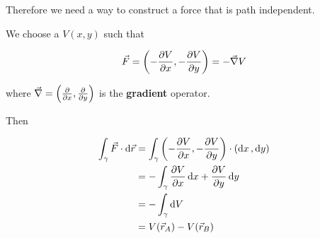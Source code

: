 \documentclass[10pt]{extarticle}
\begin{document}
Therefore we need a way to construct a force that is path independent.

We choose a $V(x, y)$ such that

$$
  \vec{F} = \left( - \pdv{V}{x}, - \pdv{V}{y} \right) = -\vec{\nabla} V
$$

where $\vec{\nabla} = \left( \pdv{x}, \pdv{y} \right)$ is the \textbf{gradient} operator.

Then

\begin{align*}
  \int_\gamma \vec{F} \cdot \dd{\vec{r}} & = \int_\gamma \left( -\pdv{V}{x}, -\pdv{V}{y} \right) \cdot (\dd{x}, \dd{y}) \\
                                         & = - \int_\gamma \pdv{V}{x} \dd{x} + \pdv{V}{y} \dd{y}                        \\
                                         & = - \int_\gamma \dd{V}                                                       \\
                                         & = V(\vec{r}_A) - V(\vec{r}_B)
\end{align*}
\end{document}
